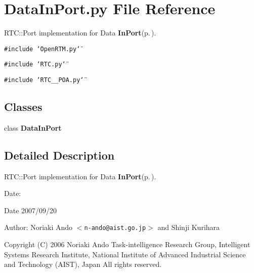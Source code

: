 \section{Data\-In\-Port.py File Reference}
\label{DataInPort_8py}
RTC::Port implementation for Data {\bf In\-Port}{\rm (p.\,\pageref{classInPort})}. 

{\tt \#include \char`\"{}Open\-RTM.py\char`\"{}}\par
{\tt \#include \char`\"{}RTC.py\char`\"{}}\par
{\tt \#include \char`\"{}RTC\_\-\_\-POA.py\char`\"{}}\par
\subsection*{Classes}
\begin{CompactItemize}
\item 
class {\bf Data\-In\-Port}
\end{CompactItemize}


\subsection{Detailed Description}
RTC::Port implementation for Data {\bf In\-Port}{\rm (p.\,\pageref{classInPort})}. 

\begin{Desc}
\item[Date:]\begin{Desc}
\item[Date]2007/09/20 \end{Desc}
\end{Desc}
\begin{Desc}
\item[Author:]Noriaki Ando $<${\tt n-ando@aist.go.jp}$>$ and Shinji Kurihara\end{Desc}
Copyright (C) 2006 Noriaki Ando Task-intelligence Research Group, Intelligent Systems Research Institute, National Institute of Advanced Industrial Science and Technology (AIST), Japan All rights reserved.